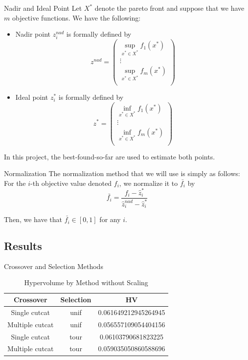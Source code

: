 \begin{frame}{Nadir and Ideal Point}
    Let \(X^*\) denote the pareto front and suppose that we have \(m\) objective functions. We have the following:
    \begin{itemize}
        \item Nadir point \(z_i^{nad}\) is formally defined by
            \[
                z^{nad} = \begin{pmatrix}
                    \sup_{x^* \in X^*} f_1(x^*) \\
                    \vdots \\
                    \sup_{x^* \in X^*} f_m(x^*) \\
                \end{pmatrix}
            \]
        \item Ideal point \(z_i^*\) is formally defined by
            \[
                z^{*} = \begin{pmatrix}
                    \inf_{x^* \in X^*} f_1(x^*) \\
                    \vdots \\
                    \inf_{x^* \in X^*} f_m(x^*) \\
                \end{pmatrix}
            \]
    \end{itemize}
    In this project, the best-found-so-far are used to estimate both points.
\end{frame}

\begin{frame}{Normalization}
    The normalization method that we will use is simply as follows: For the \(i\)-th objective value denoted \(f_i\), we normalize it to \(\bar{f_i}\) by
    \[
        \bar{f_i} = \frac{f_i - \hat{z}^*_i}{\hat{z}_i^{nad} - \hat{z}_i^*}
    \]

    Then, we have that \(\bar{f_i} \in [0, 1]\) for any \(i\).
\end{frame}

\subsection{Results}

\begin{frame}{Crossover and Selection Methods}
    \begin{table}[h]
        \caption{Hypervolume by Method without Scaling}
        \begin{tabular}{ccc}
            \toprule
            Crossover & Selection & HV \\
            \midrule
            Single cutcat & unif & 0.061649212945264945 \\
            Multiple cutcat & unif & 0.056557109054404156 \\
            Single cutcat & tour & 0.06103790681823225 \\
            Multiple cutcat & tour & 0.059035050860588696 \\
            \bottomrule
        \end{tabular}
    \end{table}
\end{frame}

